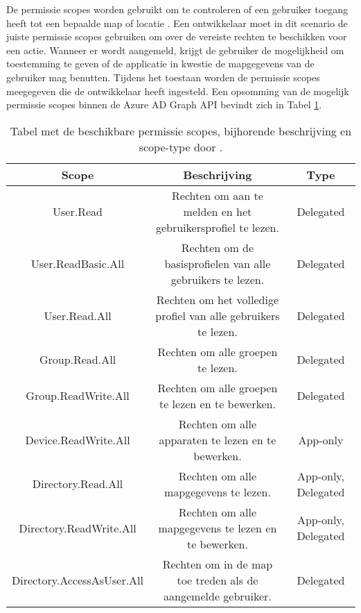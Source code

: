 De permissie scopes worden gebruikt om te controleren of een gebruiker toegang heeft tot een bepaalde map of locatie \autocite{Microsoft2016a}. Een ontwikkelaar moet in dit scenario de juiste permissie scopes gebruiken om over de vereiste rechten te beschikken voor een actie. Wanneer er wordt aangemeld, krijgt de gebruiker de mogelijkheid om toestemming te geven of de applicatie in kwestie de mapgegevens van de gebruiker mag benutten. Tijdens het toestaan worden de permissie scopes meegegeven die de ontwikkelaar heeft ingesteld. Een opsomming van de mogelijk permissie scopes binnen de Azure \ac{AD} Graph \ac{API} bevindt zich in Tabel \ref{psaad}. \\

\begin{table}[ht]
    \centering
    \begin{adjustbox}{width=1\textwidth}
    \begin{tabular}{ |c|c|c| }
        \hline
        \textbf{Scope} & \textbf{Beschrijving} & \textbf{Type} \\
        \hline
        User.Read & Rechten om aan te melden en het gebruikersprofiel te lezen. & Delegated \\
        User.ReadBasic.All & Rechten om de basisprofielen van alle gebruikers te lezen. & Delegated \\
        User.Read.All & Rechten om het volledige profiel van alle gebruikers te lezen. & Delegated \\
        Group.Read.All & Rechten om alle groepen te lezen. & Delegated \\
        Group.ReadWrite.All & Rechten om alle groepen te lezen en te bewerken. & Delegated \\
        Device.ReadWrite.All & Rechten om alle apparaten te lezen en te bewerken. & App-only \\
        Directory.Read.All & Rechten om alle mapgegevens te lezen. & App-only, Delegated \\
        Directory.ReadWrite.All & Rechten om alle mapgegevens te lezen en te bewerken. & App-only, Delegated \\
        Directory.AccessAsUser.All & Rechten om in de map toe treden als de aangemelde gebruiker. & Delegated \\
        \hline
    \end{tabular}
    \end{adjustbox}
    \caption[Tabel Azure AD Graph Permission scopes]{Tabel met de beschikbare permissie scopes, bijhorende beschrijving en scope-type door \textcite{Microsoft2016a}.}
    \label{psaad}
\end{table}

